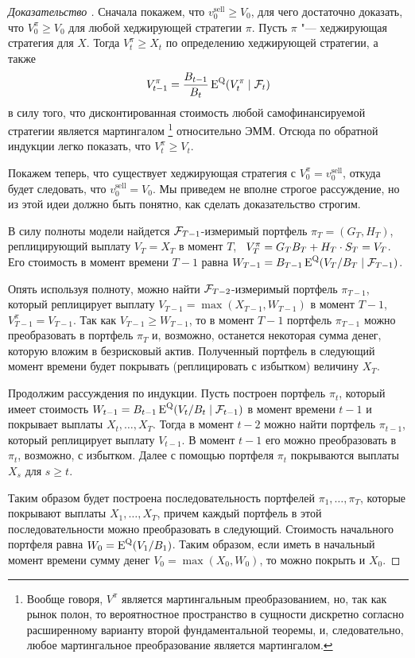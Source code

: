 \begin{proof}[Доказательство \difficult]
Сначала покажем, что $v_0^\text{sell}\ge V_0$, для чего достаточно доказать, что $V_0^\pi\ge V_0$ для любой хеджирующей стратегии $\pi$.
Пусть $\pi$ "--- хеджирующая стратегия для $X$. Тогда $V_t^\pi \ge X_t$ по определению хеджирующей стратегии, а также 
\[
V_{t-1}^\pi = \frac{B_{t-1}}{B_t} \operatorname{E}^{\mathrm{Q}}(V_t^\pi \mid \mathcal{F}_t)
\]
в силу того, что дисконтированная стоимость любой самофинансируемой стратегии является мартингалом%
\footnote{Вообще говоря, $V^\pi$ является мартингальным преобразованием, но, так как рынок полон, то вероятностное пространство в сущности дискретно согласно расширенному варианту второй фундаментальной теоремы, и, следовательно, любое мартингальное преобразование является мартингалом.}
относительно ЭММ.
Отсюда по обратной индукции легко показать, что $V_t^\pi \ge V_t$.

Покажем теперь, что существует хеджирующая стратегия с $V_0^\pi = v_0^\text{sell}$, откуда будет следовать, что $v_0^\text{sell} = V_0$.
Мы приведем не вполне строгое рассуждение, но из этой идеи должно быть понятно, как сделать доказательство строгим.

В силу полноты модели найдется $\mathcal{F}_{T-1}$-измеримый портфель $\pi_T=(G_T,H_T)$, реплицирующий выплату $V_T = X_T$ в момент $T$, \te\  $V_T^\pi = G_TB_T + {H_T}\cdot{S_T} = V_T$.
Его стоимость в момент времени $T-1$ равна $W_{T-1} = B_{T-1}\operatorname{E}^{\mathrm{Q}}(V_T/B_T\mid \mathcal{F}_{T-1})$. 

Опять используя полноту, можно найти $\mathcal{F}_{T-2}$-измеримый портфель $\pi_{T-1}$, который реплицирует выплату $V_{T-1} = \max(X_{T-1}, W_{T-1})$ в момент $T-1$, \te\ $V_{T-1}^\pi = V_{T-1}$.
Так как $V_{T-1} \ge W_{T-1}$, то в момент $T-1$ портфель $\pi_{T-1}$ можно преобразовать в портфель $\pi_T$ и, возможно, останется некоторая сумма денег, которую вложим в безрисковый актив. 
Полученный портфель в следующий момент времени будет покрывать (реплицировать с избытком) величину $X_T$. 

Продолжим рассуждения по индукции.
Пусть построен портфель $\pi_t$, который имеет стоимость $W_{t-1} = B_{t-1}\operatorname{E}^{\mathrm{Q}}(V_t/B_t\mid \mathcal{F}_{t-1})$ в момент времени $t-1$ и покрывает выплаты $X_t,\dots,X_T$. Тогда в момент $t-2$ можно найти портфель $\pi_{t-1}$, который реплицирует выплату $V_{t-1}$.
В момент $t-1$ его можно преобразовать в $\pi_t$, возможно, с избытком.
Далее с помощью портфеля $\pi_t$ покрываются выплаты $X_s$ для $s\ge t$.

Таким образом будет построена последовательность портфелей $\pi_1,\dots,\pi_T$, которые покрывают выплаты $X_1,\dots,X_T$, причем каждый портфель в этой последовательности можно преобразовать в следующий. 
Стоимость начального портфеля равна $W_0 = \operatorname{E}^{\mathrm{Q}}(V_1/B_1)$.
Таким образом, если иметь в начальный момент времени сумму денег $V_0 = \max(X_0, W_0)$, то можно покрыть и $X_0$.
\end{proof}

